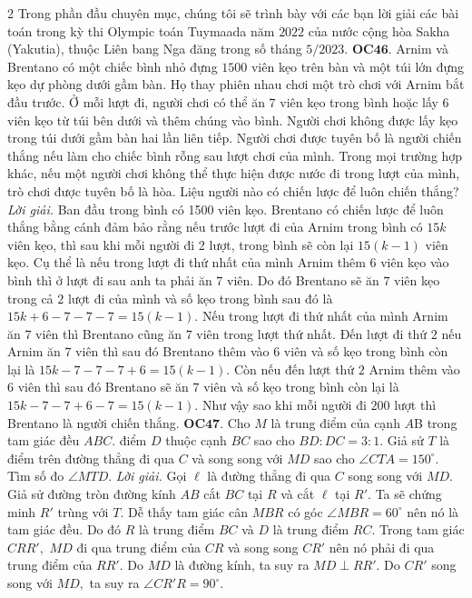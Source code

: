 \begin{multicols}{2
	Trong phần đầu chuyên mục, chúng tôi sẽ trình bày với các bạn lời giải các bài toán trong kỳ thi Olympic toán Tuymaada năm $2022$ của nước cộng hòa Sakha (Yakutia), thuộc Liên bang Nga đăng trong số tháng $5/2023$. 
	\vskip 0.1cm
	{\bf\color{cackithi} OC$\pmb{46.}$} Arnim và Brentano có một chiếc bình nhỏ đựng $1500$ viên kẹo trên bàn và một túi lớn đựng kẹo dự phòng dưới gầm bàn. Họ thay phiên nhau chơi một trò chơi với Arnim bắt đầu trước. Ở mỗi lượt đi, người chơi có thể ăn $7$ viên kẹo trong bình hoặc lấy 6 viên kẹo từ túi bên dưới và thêm chúng vào bình. Người chơi không được lấy kẹo trong túi dưới gầm bàn hai lần liên tiếp. Người chơi được tuyên bố là người chiến thắng nếu làm cho chiếc bình rỗng sau lượt chơi của mình. Trong mọi trường hợp khác, nếu
	một người chơi không thể thực hiện được nước đi trong lượt của mình, trò chơi được tuyên bố là hòa. Liệu người nào có chiến lược để luôn chiến thắng?
	\vskip 0.1cm
	\textit{Lời giải.} Ban đầu trong bình có 1500 viên kẹo. Brentano có chiến lược để luôn thắng bằng cánh đảm bảo rằng nếu trước lượt đi của Arnim trong bình có $15k$ viên kẹo, thì sau khi mỗi người đi 2 lượt, trong bình sẽ còn lại $15(k-1)$ viên kẹo. 
	\vskip 0.1cm
	Cụ thể là nếu trong lượt đi thứ nhất của mình Arnim thêm $6$ viên kẹo vào bình thì ở lượt đi sau anh ta phải ăn $7$ viên. Do đó Brentano sẽ ăn $7$ viên kẹo trong cả $2$ lượt đi của mình và số kẹo trong bình sau đó là $15k+6-7-7-7=15(k-1).$ Nếu trong lượt đi thứ nhất của mình Arnim  ăn $7$ viên thì Brentano cũng ăn $7$ viên trong lượt thứ nhất. 
	Đến lượt đi thứ $2$ nếu Arnim ăn $7$ viên thì sau đó Brentano thêm vào $6$ viên và số kẹo trong bình còn lại là $15k-7-7-7+6=15(k-1).$    Còn nếu đến lượt thứ $2$ Arnim thêm vào 6 viên thì sau đó Brentano sẽ ăn $7$ viên và số kẹo trong bình còn lại là $15k-7-7+6-7=15(k-1).$ Như vậy sao khi mỗi người đi $200$ lượt thì Brentano là người chiến thắng.
	\vskip 0.1cm
	{\bf\color{cackithi}OC$\pmb{47.}$}  Cho $M$ là trung điểm của cạnh $A$B trong tam giác đều $ABC.$ điểm $D$ thuộc cạnh $BC$ sao cho $BD : DC = 3 : 1.$ Giả sử $T$ là điểm trên đường thẳng đi qua $C$ và song song với $MD$ sao cho $\angle CTA = 150^\circ.$ Tìm số đo $\angle MTD.$
	\vskip 0.1cm
	\textit{Lời giải.} Gọi $\ell$ là đường thẳng đi qua $C$ song song với $MD.$ Giả sử đường tròn đường kính $AB$ cắt $BC$ tại $R$ và cắt $\ell$ tại $R'.$  Ta sẽ chứng minh  $R'$ trùng với  $T.$ 
	\vskip 0.1cm
	Dễ thấy tam giác cân $MBR$ có góc $\angle MBR=60^\circ$ nên nó là tam giác đều. Do đó $R$ là trung điểm $BC$ và $D$ là trung điểm $RC.$ Trong tam giác $CRR',$ $MD$ đi qua trung điểm của $CR$ và song song $CR'$ nên nó phải đi qua trung điểm của $RR'.$ Do $MD$ là đường kính, ta suy ra $MD\perp RR'.$ Do $CR'$ song song với $MD,$ ta suy ra $\angle CR'R=90^\circ.$ 
}
\end{multicols}

